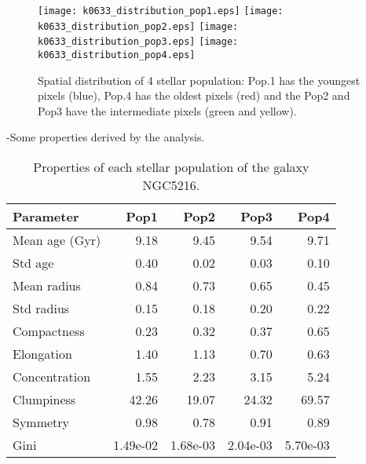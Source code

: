 \begin{figure}[bh]
\begin{center}
\texttt{[image: k0633\_distribution\_pop1.eps]}
\texttt{[image: k0633\_distribution\_pop2.eps]}
\texttt{[image: k0633\_distribution\_pop3.eps]}
\texttt{[image: k0633\_distribution\_pop4.eps]}
 \caption{Spatial distribution of 4 stellar population: Pop.1 has the youngest pixels (blue), Pop.4 has the oldest pixels (red) and the Pop2 and Pop3 have the intermediate pixels (green and yellow).}
   \label{fig1}
\end{center}
\end{figure}

-Some properties derived by the analysis.


\begin{table}[h]
\centering
\begin{tabular}{l|r|r|r|r}
Parameter & Pop1 & Pop2 & Pop3 & Pop4 \\\hline
Mean age (Gyr) & 9.18 & 9.45 & 9.54 & 9.71 \\
Std age & 0.40 & 0.02 & 0.03 & 0.10 \\
Mean radius & 0.84 & 0.73 & 0.65 & 0.45 \\
Std radius & 0.15 & 0.18 & 0.20 & 0.22 \\
Compactness & 0.23 & 0.32 & 0.37 & 0.65 \\
Elongation & 1.40 & 1.13 & 0.70 & 0.63 \\
Concentration & 1.55 & 2.23 & 3.15 & 5.24  \\
Clumpiness & 42.26 & 19.07 & 24.32 & 69.57 \\
Symmetry & 0.98 & 0.78 & 0.91 & 0.89 \\
Gini & 1.49e-02 & 1.68e-03 & 2.04e-03 & 5.70e-03 \\
\end{tabular}
\caption{\label{tab:widgets}Properties of each stellar population of the galaxy NGC5216.}
\end{table}

